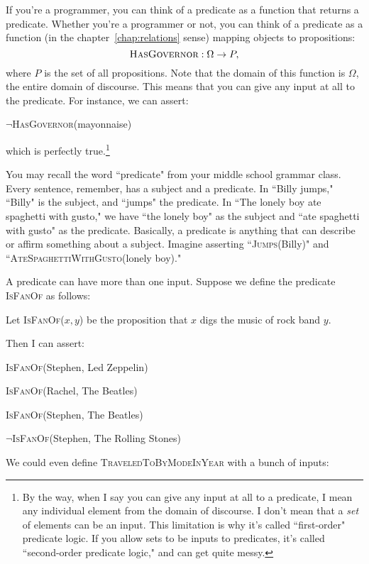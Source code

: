 If you're a programmer, you can think of a predicate as a function that
returns a predicate. Whether you're a programmer or not, you can think of a
predicate as a function (in the chapter~\ref{chap:relations} sense) mapping
objects to propositions:
\[
\textsc{HasGovernor} : \Omega \rightarrow P,
\]
where $P$ is the set of all propositions. Note that the domain of this
function is $\Omega$, the entire domain of discourse. This means that you
can give any input at all to the predicate. For instance, we can assert:
\begin{center}
$\neg$\textsc{HasGovernor}(mayonnaise)
\end{center}
which is perfectly true.\footnote{By the way, when I say you can give any
input at all to a predicate, I mean any individual element from the domain
of discourse. I don't mean that a \textit{set} of elements can be an input.
This limitation is why it's called ``first-order" predicate logic.  If you
allow sets to be inputs to predicates, it's called ``second-order predicate
logic," and can get quite messy.} 

You may recall the word ``predicate" from your middle school grammar class.
Every sentence, remember, has a subject and a predicate. In ``Billy jumps,"
``Billy" is the subject, and ``jumps" the predicate. In ``The lonely boy ate
spaghetti with gusto," we have ``the lonely boy" as the subject and ``ate
spaghetti with gusto" as the predicate. Basically, a predicate is anything that
can describe or affirm something about a subject. Imagine asserting
``\textsc{Jumps}(Billy)" and ``\textsc{AteSpaghettiWithGusto}(lonely boy)."

A predicate can have more than one input. Suppose we define the predicate
\textsc{IsFanOf} as follows:

\quad\quad Let \textsc{IsFanOf}($x,y$) be the proposition that $x$ digs the music of rock band $y$.

Then I can assert:
\begin{center}
\textsc{IsFanOf}(Stephen, Led Zeppelin)

\textsc{IsFanOf}(Rachel, The Beatles)

\textsc{IsFanOf}(Stephen, The Beatles)

$\neg$\textsc{IsFanOf}(Stephen, The Rolling Stones)
\end{center}
We could even define \textsc{TraveledToByModeInYear} with a bunch of inputs:

